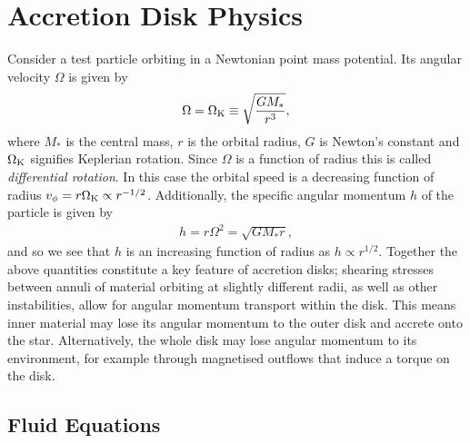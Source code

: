 
\section{Accretion Disk Physics}


Consider a test particle orbiting in a Newtonian point mass potential. Its angular velocity $\Omega$ is given by
\begin{align}
    \Omega = \Omega_{\rm K} \equiv \sqrt{\frac{G M_*}{r^3}}, \label{eq:point_pot}
\end{align}
where $M_*$ is the central mass, $r$ is the orbital radius, $G$ is Newton's constant and $\Omega_{\rm K}$ signifies Keplerian rotation. 
Since $\Omega$ is a function of radius this is called \textit{differential rotation}.
In this case the orbital speed is a decreasing function of radius $v_\phi = r \Omega_{\rm K} \propto r^{-1/2}$.
Additionally, the specific angular momentum $h$ of the particle is given by
\begin{align}
    h = r \Omega^2 = \sqrt{G M_* r}, \label{eq:ang_mom}
\end{align}
and so we see that $h$ is an increasing function of radius as $h \propto r^{1/2}$.
Together the above quantities constitute a key feature of accretion disks; shearing stresses between annuli of material orbiting at slightly different radii, as well as other instabilities, allow for angular momentum transport within the disk. 
This means inner material may lose its angular momentum to the outer disk and accrete onto the star. 
Alternatively, the whole disk may lose angular momentum to its environment, for example through magnetised outflows that induce a torque on the disk.

\subsection{Fluid Equations} \label{sec:fluid_eqns}


